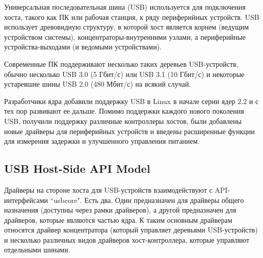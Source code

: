 

Универсальная последовательная шина (USB) используется для подключения хоста, такого как ПК или рабочая станция, к ряду периферийных устройств. USB использует древовидную структуру, в которой хост является корнем (ведущим устройством системы), концентраторы-внутренними узлами, а периферийные устройства-выходами (и ведомыми устройствами).\par
Современные ПК поддерживают несколько таких деревьев USB-устройств, обычно несколько USB 3.0 (5 Гбит/с) или USB 3.1 (10 Гбит/с) и некоторые устаревшие шины USB 2.0 (480 Мбит/с) на всякий случай.\par
Разработчики ядра добавили поддержку USB в Linux в начале серии ядер 2.2 и с тех пор развивают ее дальше. Помимо поддержки каждого нового поколения USB, получили поддержку различные контроллеры хостов, были добавлены новые драйверы для периферийных устройств и введены расширенные функции для измерения задержки и улучшенного управления питанием.

\subsection{USB Host-Side API Model}
Драйверы на стороне хоста для USB-устройств взаимодействуют с API-интерфейсами “usbcore". Есть два. Один предназначен для драйверы общего назначения (доступны через рамки драйверов), а другой предназначен для драйверов, которые являются частью ядра. К таким основным драйверам относятся драйвер концентратора (который управляет деревьями USB-устройств) и несколько различных видов драйверов хост-контроллера, которые управляют отдельными шинами.\par

